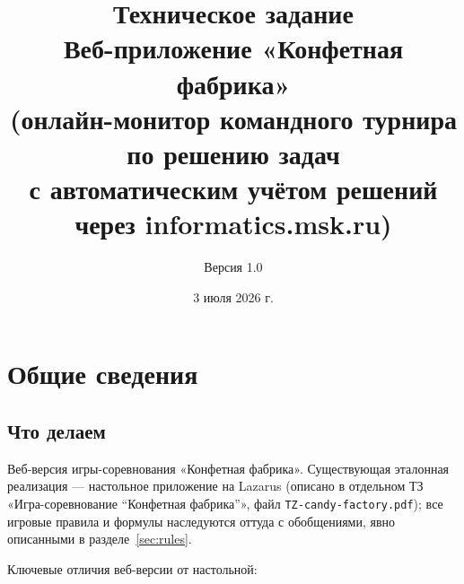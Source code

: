 \documentclass[12pt,a4paper]{article}
\title{\textbf{Техническое задание}\\[4pt]
Веб-приложение «Конфетная фабрика»\\[4pt]
\large (онлайн-монитор командного турнира по решению задач\\
с автоматическим учётом решений через informatics.msk.ru)}
\author{Версия 1.0}
\date{3 июля 2026 г.}
\newcommand{\field}[1]{\texttt{#1}}
\begin{document}
\maketitle

\tableofcontents
\newpage

\section{Общие сведения}

\subsection{Что делаем}

Веб-версия игры-соревнования «Конфетная фабрика». Существующая эталонная
реализация --- настольное приложение на Lazarus (описано в отдельном ТЗ
«Игра-соревнование ``Конфетная фабрика''», файл \field{TZ-candy-factory.pdf});
все игровые правила и формулы наследуются оттуда с обобщениями, явно
описанными в разделе~\ref{sec:rules}.

Ключевые отличия веб-версии от настольной:
\end{document}
